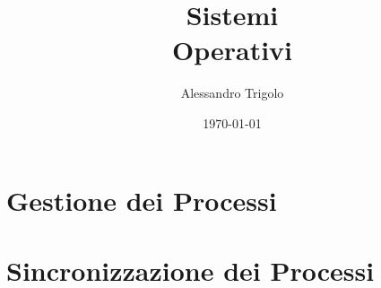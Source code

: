 \documentclass[titlepage]{article}
\title{\textbf{\fontsize{35pt}{35pt}\selectfont Sistemi\\\vspace{25pt}Operativi}}
\author{Alessandro Trigolo}
\date{\today}
\begin{document}
\maketitle

\newpage\tableofcontents

\newpage\listoffigures

\newpage\lstlistoflistings


\lstset{style = C++}

\newpage\part{Gestione dei Processi}








\newpage\part{Sincronizzazione dei Processi}









\end{document}
